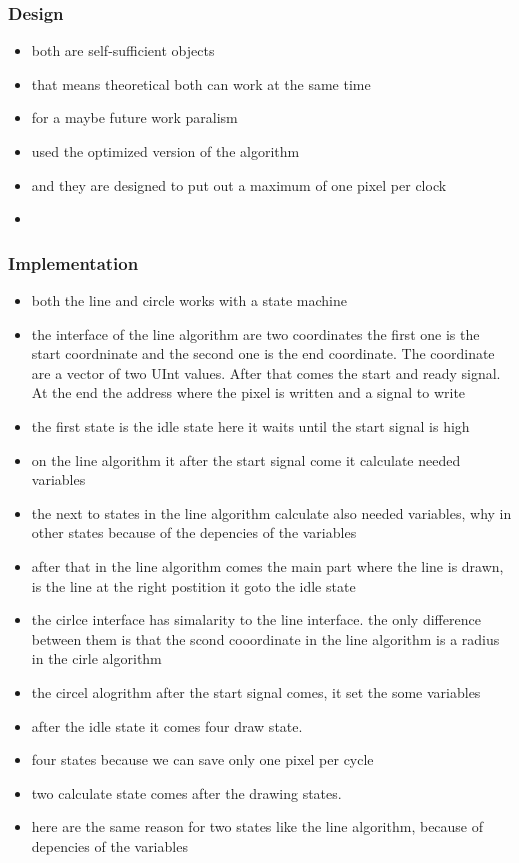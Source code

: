 \subsubsection*{Design}
\begin{itemize}
	\item both are self-sufficient objects
	\item that means theoretical both can work at the same time
	\item for a maybe future work paralism
	\item used the optimized version of the algorithm
	\item and they are designed to put out a maximum of one pixel per clock
	\item 
\end{itemize}
\subsubsection*{Implementation}
\begin{itemize}
	\item both the line and circle works with a state machine
	\item the interface of the line algorithm are two coordinates the first one is the start coordninate and the second one is the end coordinate. The coordinate are a vector of two UInt values. After that comes the start and ready signal. At the end the address where the pixel is written and a signal to write
	\item the first state is the idle state here it waits until the start signal is high
	\item on the line algorithm it after the start signal come it calculate needed variables
	\item the next to states in the line algorithm calculate also needed variables, why in other states because of the depencies of the variables
	\item after that in the line algorithm comes the main part where the line is drawn, is the line at the right postition it goto the idle state
	\item the cirlce interface has simalarity to the line interface. the only difference between them is that the scond cooordinate in the line algorithm is a radius in the cirle algorithm
	\item the circel alogrithm after the start signal comes, it set the some variables
	\item after the idle state it comes four draw state.
	\item four states because we can save only one pixel per cycle
	\item two calculate state comes after the drawing states.  
	\item here are the same reason for two states like the line algorithm, because of depencies of the variables
\end{itemize}